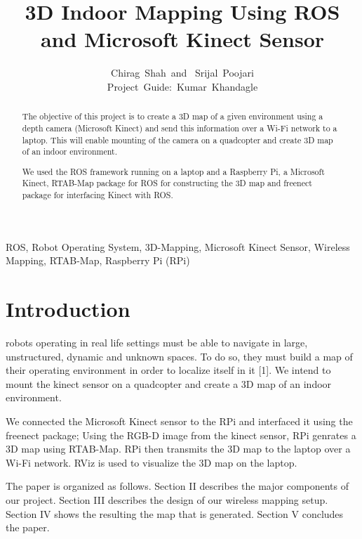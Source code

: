 \documentclass[journal]{IEEEtran}
\begin{document}
\title{3D Indoor Mapping Using ROS and Microsoft Kinect Sensor}
\author{Chirag~Shah~and
        ~Srijal~Poojari
        \\Project~Guide:~Kumar~Khandagle}%

\maketitle
\begin{abstract}
The objective of this project is to create a 3D map of a given environment using a depth camera (Microsoft Kinect) and send this information over a Wi-Fi network to a laptop. This will enable mounting of the camera on a quadcopter and create 3D  map of an indoor environment.

We used the ROS framework running on a laptop and a Raspberry Pi, a Microsoft Kinect, RTAB-Map package for ROS for constructing the 3D map and freenect package for interfacing Kinect with ROS.
\end{abstract}

\begin{IEEEkeywords}
ROS, Robot Operating System, 3D-Mapping, Microsoft Kinect Sensor, Wireless Mapping, RTAB-Map, Raspberry Pi (RPi)
\end{IEEEkeywords}

\section{Introduction}
 robots operating in real life settings must be able to navigate in large, unstructured, dynamic and unknown spaces. To do so, they must build a map of their operating environment in order to localize itself in it [1]. We intend to mount the kinect sensor on a quadcopter and create a 3D map of an indoor environment.

We connected the Microsoft Kinect sensor to the RPi and interfaced it using the freenect package; Using the RGB-D image from the kinect sensor, RPi genrates a 3D map using RTAB-Map. RPi then transmits the 3D map to the laptop over a Wi-Fi network. RViz is used to visualize the 3D map on the laptop.

The paper is organized as follows. Section II describes the major components of our project. Section III describes the design of our wireless mapping setup. Section IV shows the resulting the map that is generated. Section V concludes the paper.
\end{document}
